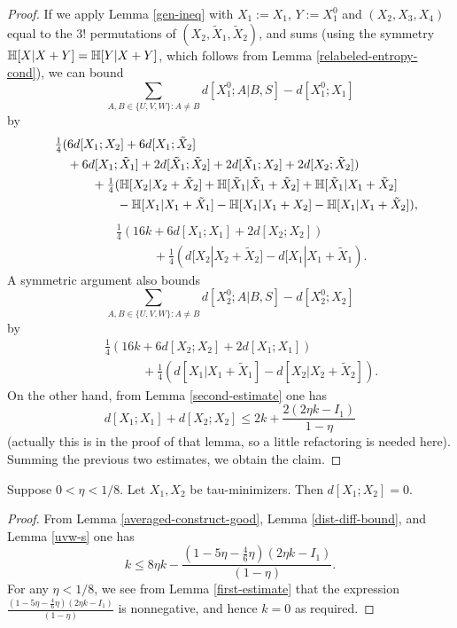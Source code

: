 \begin{proof}  If we apply Lemma \ref{gen-ineq} with $X_1:=X_1$, $Y:=X_1^0$ and $(X_2,X_3,X_4)$ equal to the $3!$ permutations of $(X_2,\tilde X_1,\tilde X_2)$, and sums (using the symmetry $\mathbb{H}[X|X+Y] = \mathbb{H}[Y|X+Y]$, which follows from Lemma \ref{relabeled-entropy-cond}), we can bound
$$ \sum_{A,B \in \{U,V,W\}: A \neq B}  d[X_1^0;A|B, S] - d[X_1^0;X_1]$$
by
\begin{align*}
  &\quad \tfrac{1}{4} (6d[X_1;X_2] + 6d[X_1;\tilde X_2]\\
  &\qquad + 6d[X_1;\tilde X_1] + 2d[\tilde X_1;\tilde X_2] + 2 d[\tilde X_1;X_2] + 2d[X_2;\tilde X_2])\\
  &\qquad \qquad + \tfrac{1}{4} (\mathbb{H}[X_2|X_2+\tilde X_2] + \mathbb{H}[\tilde X_1|\tilde X_1+\tilde X_2] + \mathbb{H}[\tilde X_1|X_1+\tilde X_2] \\
  &\qquad \qquad \qquad - \mathbb{H}[X_1|X_1+\tilde X_1] - \mathbb{H}[X_1|X_1+X_2] - \mathbb{H}[X_1|X_1+\tilde X_2]),
\end{align*}
\begin{align*}
  &\quad \tfrac{1}{4} (16k + 6d[X_1;X_1] + 2d[X_2;X_2])\\
  &\qquad \qquad + \tfrac{1}{4} (d[X_2|X_2+\tilde X_2] - d[X_1|X_1+\tilde X_1).
\end{align*}
A symmetric argument also bounds
$$ \sum_{A,B \in \{U,V,W\}: A \neq B}  d[X_2^0;A|B, S] - d[X_2^0;X_2]$$
by
\begin{align*}
  &\quad \tfrac{1}{4} (16k + 6d[X_2;X_2] + 2d[X_1;X_1])\\
  &\qquad \qquad + \tfrac{1}{4} (d[X_1|X_1+\tilde X_1] - d[X_2|X_2+\tilde X_2]).
\end{align*}
On the other hand, from Lemma \ref{second-estimate} one has
$$ d[X_1;X_1] + d[X_2;X_2] \leq 2 k + \frac{2(2 \eta k - I_1)}{1-\eta}$$
(actually this is in the proof of that lemma, so a little refactoring is needed here).  Summing the previous two estimates, we obtain the claim.
\end{proof}

\begin{theorem}\label{de-prop'}\leanok
Suppose $0 < \eta < 1/8$.  Let $X_1, X_2$ be tau-minimizers.  Then $d[X_1;X_2] = 0$.
\end{theorem}

\begin{proof}  From Lemma \ref{averaged-construct-good}, Lemma \ref{dist-diff-bound}, and Lemma \ref{uvw-s} one has
  \[ k \leq 8\eta k - \frac{(1 -5 \eta - \frac{4}{6} \eta)(2 \eta k - I_1)}{(1-\eta)}.\]
  For any $\eta < 1/8$, we see from Lemma \ref{first-estimate} that the expression $\frac{(1 -5 \eta - \frac{4}{6} \eta)(2 \eta k - I_1)}{(1-\eta)}$ is nonnegative, and hence $k = 0$ as required.
\end{proof}

